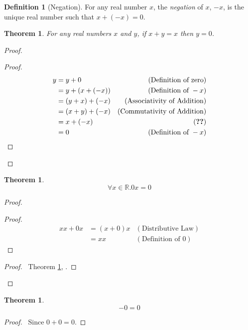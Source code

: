 \documentclass{report}
\let\qed\relax
\newtheorem{thm}[ax]{Theorem}
\theoremstyle{definition}
\newtheorem{df}[ax]{Definition}
\begin{document}
\begin{df}[Negation]
For any real number $x$, the \emph{negation} of $x$, $-x$, is the unique real number such that $x + (-x) = 0$.
\end{df}

\begin{thm}
\label{thm:y_equals_zero}
For any real numbers $x$ and $y$, if $x + y = x$ then $y = 0$.
\end{thm}

\begin{proof}
\pf
{}
\begin{proof}
	\pf
	\begin{align*}
		y & = y + 0 & (\text{Definition of zero}) \\
		& = y + (x + (-x)) & (\text{Definition of } -x) \\
		& = (y + x) + (-x) & (\text{Associativity of Addition}) \\
		& = (x + y) + (-x) & (\text{Commutativity of Addition}) \\
		& = x + (-x) & (\text{\stepref{2}}) \\
		& = 0 & (\text{Definition of } -x)
	\end{align*}
\end{proof}
\qed
\end{proof}

\begin{thm}
\label{thm:multiply_by_zero}
\[ \forall x \in \mathbb{R}. 0x = 0 \]
\end{thm}

\begin{proof}
\pf
{}
\begin{proof}
	\pf
	\begin{align*}
		xx + 0x & = (x + 0) x & (\text{Distributive Law}) \\
		& = xx & (\text{Definition of } 0)
	\end{align*}
\end{proof}
\begin{proof}
	\pf\ Theorem \ref{thm:y_equals_zero}, .
\end{proof}
\qed
\end{proof}

\begin{thm}
\[ -0 = 0 \]
\end{thm}

\begin{proof}
\pf\ Since $0 + 0 = 0$. \qed
\end{proof}
\end{document}
